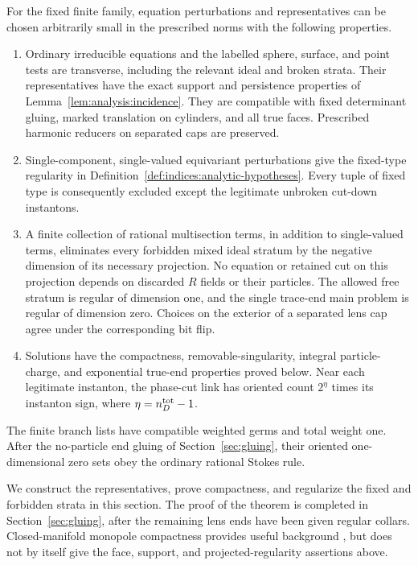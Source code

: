 \begin{theorem}\label{thm:analysis:regularization}
For the fixed finite family, equation perturbations and representatives
can be chosen arbitrarily small in the prescribed norms with the following
properties.
\begin{enumerate}
\item Ordinary irreducible equations and the labelled sphere, surface,
and point tests are transverse, including the relevant ideal and broken
strata.  Their representatives have the exact support and persistence
properties of Lemma~\ref{lem:analysis:incidence}.  They are compatible with
fixed determinant gluing, marked translation on cylinders, and all true
faces.  Prescribed harmonic reducers on separated caps are preserved.
\item Single-component, single-valued equivariant perturbations give the
fixed-type regularity in Definition~\ref{def:indices:analytic-hypotheses}.
Every tuple of fixed type is consequently excluded except the legitimate
unbroken cut-down instantons.
\item A finite collection of rational multisection terms, in addition to
single-valued terms, eliminates every forbidden mixed ideal stratum by
the negative dimension of its necessary projection.  No equation or
retained cut on this projection depends on discarded $R$ fields or their
particles.  The allowed free stratum is regular of dimension one, and the
single trace-end main problem is regular of dimension zero.  Choices on
the exterior of a separated lens cap agree under the corresponding bit
flip.
\item Solutions have the compactness, removable-singularity, integral
particle-charge, and exponential true-end properties proved below.
Near each legitimate instanton, the phase-cut link has oriented count
$2^\eta$ times its instanton sign, where $\eta=n_D^{\rm tot}-1$.
\end{enumerate}
The finite branch lists have compatible weighted germs and total weight
one.  After the no-particle end gluing of Section~\ref{sec:gluing}, their
oriented one-dimensional zero sets obey the ordinary rational Stokes
rule.
\end{theorem}

We construct the representatives, prove compactness, and regularize the
fixed and forbidden strata in this section.  The proof of the theorem is
completed in Section~\ref{sec:gluing}, after the remaining lens ends have
been given regular collars.  Closed-manifold monopole compactness
provides useful background \cite{FeehanLenessPU2I}, but does not by itself
give the face, support, and projected-regularity assertions above.

